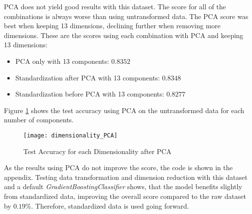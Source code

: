 \ac{PCA} does not yield good results with this dataset. The score for all of the combinations is always worse
than using untransformed data. 
The PCA score was best when keeping 13 dimensions, declining further when removing more dimensions.
These are the scores using each combination with PCA and keeping 13 dimensions:

\begin{itemize}
    \item PCA only with 13 components: $0.8352$
    \item Standardization after PCA with 13 components: $0.8348$
    \item Standardization before PCA with 13 components: $0.8277$
\end{itemize}

Figure \ref{fig:Score for each PCA dimensionality} shows the test accuracy using PCA on the untransformed data
for each number of components.

\begin{figure}[H]
    \caption{Test Accuracy for each Dimensionality after PCA}
	\label{fig:Score for each PCA dimensionality}
    \texttt{[image: dimensionality\_PCA]}
\end{figure}

As the results using \ac{PCA} do not improve the score, the code is shown in the appendix.
Testing data transformation and dimension reduction with this dataset and a default \emph{GradientBoostingClassifier}
shows, that the model benefits slightly from standardized data, improving the overall score compared to the raw dataset
by $0.19\%$. Therefore, standardized data is used going forward.


